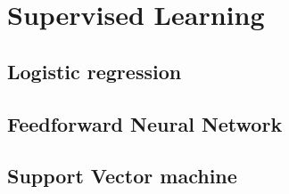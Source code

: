 \section{Supervised Learning}
%
\begin{mdframed}[style=eqbox]
\subsection{Logistic regression}
\end{mdframed}
%
\begin{mdframed}[style=eqbox]
\subsection{Feedforward Neural Network}
\end{mdframed}
%
\begin{mdframed}[style=eqbox]
\subsection{Support Vector machine}
\end{mdframed}
